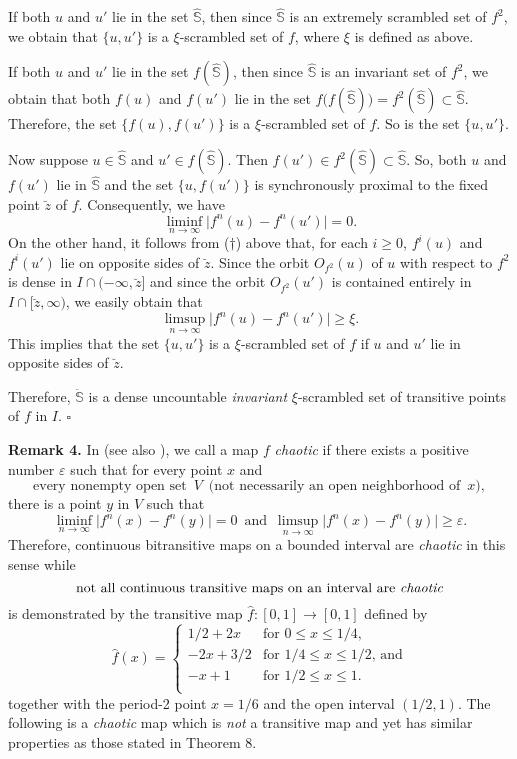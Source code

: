 \documentclass[12pt]{article}
\newcommand{\sq}{$\square$}
\newcommand{\va}{\varepsilon}
\begin{document}
If both $u$ and $u'$ lie in the set $\widehat {\mathbb S}$, then since $\widehat {\mathbb S}$ is an extremely scrambled set of $f^2$, we obtain that $\{ u, u' \}$ is a $\xi$-scrambled set of $f$, where $\xi$ is defined as above.

If both $u$ and $u'$ lie in the set $f(\widehat {\mathbb S})$, then since $\widehat {\mathbb S}$ is an invariant set of $f^2$, we obtain that both $f(u)$ and $f(u')$ lie in the set $f\big(f(\widehat {\mathbb S})\big) = f^2(\widehat {\mathbb S}) \subset \widehat {\mathbb S}$.  Therefore, the set $\big\{ f(u), f(u') \big\}$ is a $\xi$-scrambled set of $f$.  So is the set $\{ u, u' \}$.

Now suppose $u \in \widehat {\mathbb S}$ and $u' \in f(\widehat {\mathbb S})$.  Then $f(u') \in f^2(\widehat {\mathbb S}) \subset \widehat {\mathbb S}$.  So, both $u$ and $f(u')$ lie in $\widehat {\mathbb S}$ and the set $\big\{ u, f(u') \big\}$ is synchronously proximal to the fixed point $\breve z$ of $f$.  Consequently, we have 
$$
\liminf_{n \to \infty} \big|f^n(u) - f^n(u')\big| = 0.
$$
On the other hand, it follows from ($\dagger$) above that, for each $i \ge 0$, $f^i(u)$ and $f^i(u')$ lie on opposite sides of $\breve z$.  Since the orbit $O_{f^2}(u)$ of $u$ with respect to $f^2$ is dense in $I \cap (-\infty, \breve z]$ and since the orbit $O_{f^2}(u')$ is contained entirely in $I \cap [\breve z, \infty)$, we easily obtain that $$\limsup_{n \to \infty} \big|f^n(u) - f^n(u')\big| \ge \xi.$$This implies that the set $\{ u, u' \}$ is a $\xi$-scrambled set of $f$ if $u$ and $u'$ lie in opposite sides of $\breve z$.

Therefore, $\ddot{\mathbb S}$ is a dense uncountable {\it invariant} $\xi$-scrambled set of transitive points of $f$ in $I$.
\hfill\sq

\noindent
{\bf Remark 4.}
In {\bf\cite{du3, du4, v2, v1}} (see also {\bf\cite{wang}}), we call a map $f$ {\it chaotic} if there exists a positive number $\va$ such that for every point $x$ and $$\text{every nonempty open set} \,\,\, V \,\,\, \text{(not necessarily an open neighborhood of} \,\,\, x),$$ there is a point $y$ in $V$ such that $$\liminf_{n \to \infty} \big|f^n(x) - f^n(y)\big| = 0 \,\,\, \text{and} \,\,\, \limsup_{n \to \infty} \big|f^n(x) - f^n(y)\big| \ge \va.$$ Therefore, continuous bitransitive maps on a bounded interval are {\it chaotic} in this sense while $$\text{not all continuous transitive maps on an interval are {\it chaotic}}$$ is demonstrated by the transitive map 
$\hat f : [0, 1] \to [0, 1]$ defined by 
$$
\hat f(x) = \begin{cases}
            1/2 + 2x & \text{for $0 \le x \le 1/4$}, \\
            -2x + 3/2 & \text{for $1/4 \le x \le 1/2$, and} \\
            -x + 1 & \text{for $1/2 \le x \le 1$}. \\
            \end{cases}
$$ together with the period-2 point $x = 1/6$ and the open interval $(1/2, 1)$.
The following is a {\it chaotic} map which is {\it not} a transitive map and yet has similar properties as those stated in Theorem 8.
\end{document}
